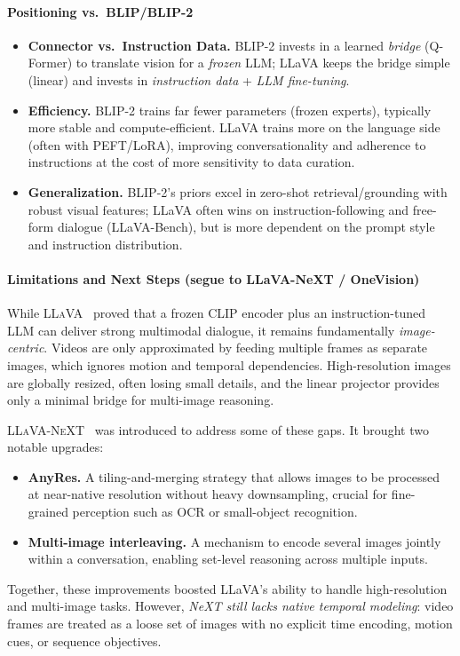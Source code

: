 \begin{enrichment}
\begin{enrichment}
        \paragraph{Positioning vs.\ BLIP/BLIP-2}
        \begin{itemize}
            \item \textbf{Connector vs.\ Instruction Data.} BLIP-2 invests in a learned \emph{bridge} (Q-Former) to translate vision for a \emph{frozen} LLM; LLaVA keeps the bridge simple (linear) and invests in \emph{instruction data} + \emph{LLM fine-tuning}.
            \item \textbf{Efficiency.} BLIP-2 trains far fewer parameters (frozen experts), typically more stable and compute-efficient. LLaVA trains more on the language side (often with PEFT/LoRA), improving conversationality and adherence to instructions at the cost of more sensitivity to data curation.
            \item \textbf{Generalization.} BLIP-2’s priors excel in zero-shot retrieval/grounding with robust visual features; LLaVA often wins on instruction-following and free-form dialogue (LLaVA-Bench), but is more dependent on the prompt style and instruction distribution.
        \end{itemize}
        
        \paragraph{Limitations and Next Steps (segue to LLaVA-NeXT / OneVision)}  
        While \textsc{LLaVA}~\cite{liu2023_llava} proved that a frozen CLIP encoder plus an instruction-tuned LLM can deliver strong multimodal dialogue, it remains fundamentally \emph{image-centric}. Videos are only approximated by feeding multiple frames as separate images, which ignores motion and temporal dependencies. High-resolution images are globally resized, often losing small details, and the linear projector provides only a minimal bridge for multi-image reasoning.  
        
        \textsc{LLaVA-NeXT}~\cite{liu2024_llava_next} was introduced to address some of these gaps. It brought two notable upgrades:  
        \begin{itemize}  
            \item \textbf{AnyRes.} A tiling-and-merging strategy that allows images to be processed at near-native resolution without heavy downsampling, crucial for fine-grained perception such as OCR or small-object recognition.  
            \item \textbf{Multi-image interleaving.} A mechanism to encode several images jointly within a conversation, enabling set-level reasoning across multiple inputs.  
        \end{itemize}  
        Together, these improvements boosted LLaVA’s ability to handle high-resolution and multi-image tasks. However, \emph{NeXT still lacks native temporal modeling}: video frames are treated as a loose set of images with no explicit time encoding, motion cues, or sequence objectives.  
        

\end{enrichment}
\end{enrichment}
